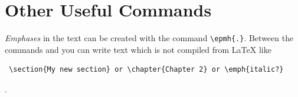 \section{Other Useful Commands}\label{sec:div}

 \emph{Emphases} in the text can be created with the command \texttt{\textbackslash epmh\{.\}}.
Between the commands  and   you can write text which is not compiled from LaTeX like \begin{verbatim} \section{My new section} or \chapter{Chapter 2} or \emph{italic?}\end{verbatim}.
